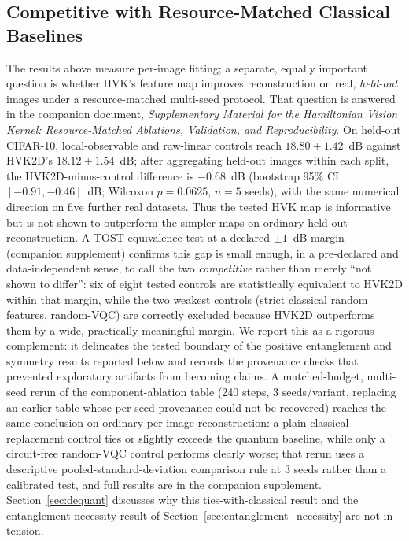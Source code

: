 \documentclass[journal]{IEEEtran}
\begin{document}
\subsection{Competitive with Resource-Matched Classical Baselines}
\label{sec:ablation_relationship}
The results above measure per-image fitting; a separate, equally important question is whether HVK's feature map improves reconstruction on real, \emph{held-out} images under a resource-matched multi-seed protocol. That question is answered in the companion document, \textit{Supplementary Material for the Hamiltonian Vision Kernel: Resource-Matched Ablations, Validation, and Reproducibility}. On held-out CIFAR-10, local-observable and raw-linear controls reach $18.80\pm1.42$~dB against HVK2D's $18.12\pm1.54$~dB; after aggregating held-out images within each split, the HVK2D-minus-control difference is $-0.68$~dB (bootstrap 95\% CI $[-0.91,-0.46]$~dB; Wilcoxon $p=0.0625$, $n=5$ seeds), with the same numerical direction on five further real datasets. Thus the tested HVK map is informative but is not shown to outperform the simpler maps on ordinary held-out reconstruction. A TOST equivalence test at a declared $\pm1$~dB margin (companion supplement) confirms this gap is small enough, in a pre-declared and data-independent sense, to call the two \emph{competitive} rather than merely ``not shown to differ'': six of eight tested controls are statistically equivalent to HVK2D within that margin, while the two weakest controls (strict classical random features, random-VQC) are correctly excluded because HVK2D outperforms them by a wide, practically meaningful margin. We report this as a rigorous complement: it delineates the tested boundary of the positive entanglement and symmetry results reported below and records the provenance checks that prevented exploratory artifacts from becoming claims. A matched-budget, multi-seed rerun of the component-ablation table (240 steps, 3 seeds/variant, replacing an earlier table whose per-seed provenance could not be recovered) reaches the same conclusion on ordinary per-image reconstruction: a plain classical-replacement control ties or slightly exceeds the quantum baseline, while only a circuit-free random-VQC control performs clearly worse; that rerun uses a descriptive pooled-standard-deviation comparison rule at 3 seeds rather than a calibrated test, and full results are in the companion supplement. Section~\ref{sec:dequant} discusses why this ties-with-classical result and the entanglement-necessity result of Section~\ref{sec:entanglement_necessity} are not in tension.
\end{document}
